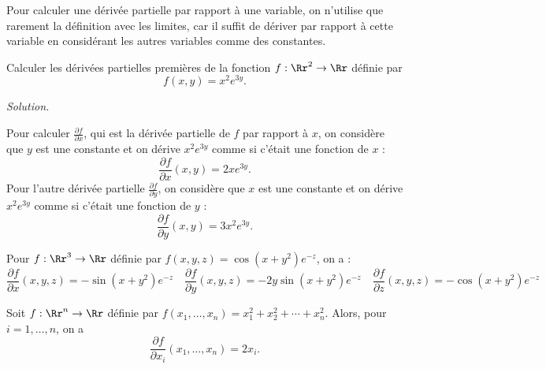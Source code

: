 \documentclass[11pt, class=report,crop=false]{standalone}
\begin{document}
Pour calculer une dérivée partielle par rapport à une variable, on n'utilise que rarement la définition avec les limites, car il suffit de dériver par rapport à cette variable en considérant les autres variables comme des constantes.


\begin{exemple}
Calculer les dérivées partielles premières de la fonction 
$f : \Rr^2 \to \Rr$ définie par 
$$f(x,y)=x^2e^{3y}.$$

\bigskip
\emph{Solution.}

Pour calculer $\frac{\partial f}{\partial x}$, qui est la dérivée partielle de $f$ par rapport à $x$, on considère que $y$ est une constante et on dérive $x^2e ^{3y}$ comme si c'était une fonction de $x$ :
$$\frac{\partial f}{\partial x}(x,y) =2xe ^{3y}.$$
Pour l'autre dérivée partielle $\frac{\partial f}{\partial y}$, on considère que $x$ est une constante et on dérive $x^2e ^{3y}$ comme si c'était une fonction de $y$ :
$$\frac{\partial f}{\partial y}(x,y) = 3x^2e ^{3y}.$$
\end{exemple}



\begin{exemple}
Pour $f : \Rr^3 \to \Rr$ définie par $f(x,y,z)=\cos (x+y^2)e^{-z}$, 
on a : 
$$\frac{\partial f}{\partial x}(x,y,z) = -\sin(x+y^2)e^{-z} \quad
\frac{\partial f}{\partial y}(x,y,z) = -2y\sin(x+y^2)e^{-z} \quad
\frac{\partial f}{\partial z}(x,y,z) = -\cos(x+y^2)e^{-z}$$
\end{exemple}


\begin{exemple}
Soit $f :\Rr^n \to \Rr$ définie par 
$f(x_1,\ldots,x_n) = x_1^2+x_2^2+\cdots + x_n^2$.
Alors, pour $i=1,\ldots,n$, on a 
$$\frac{\partial f}{\partial x_i}(x_1,\ldots,x_n) = 2x_i.$$
\end{exemple}


\bigskip
\end{document}
